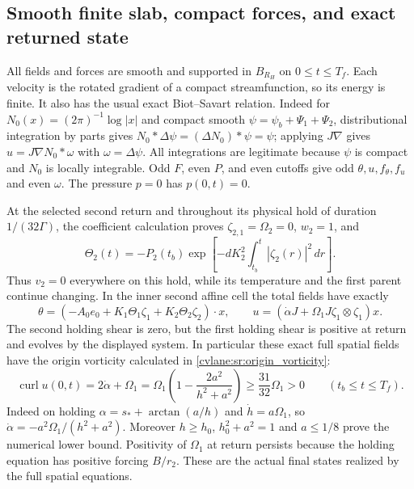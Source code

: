 \subsection{Smooth finite slab, compact forces, and exact returned state}

All fields and forces are smooth and supported in $B_{R_H}$ on
$0\leq t\leq T_f$. Each velocity is the rotated gradient of a
compact streamfunction, so its energy is finite. It also has the
usual exact Biot--Savart relation. Indeed for
$N_0(x)=(2\pi)^{-1}\log|x|$ and compact smooth
$\psi=\psi_b+\Psi_1+\Psi_2$, distributional integration by
parts gives $N_0*\Delta\psi=(\Delta N_0)*\psi=\psi$;
applying $J\nabla$ gives $u=J\nabla N_0*\omega$ with
$\omega=\Delta\psi$. All integrations are legitimate because
$\psi$ is compact and $N_0$ is locally integrable.
Odd $F$, even $P$, and even cutoffs give odd $\theta,u,f_\theta,f_u$
and even $\omega$. The pressure $p=0$ has $p(0,t)=0$.

At the selected second return and throughout its physical hold
of duration $1/(32\Gamma)$, the coefficient calculation proves
$\zeta_{2,1}=\Omega_2=0$, $w_2=1$, and
\[
 \Theta_2(t)=-P_2(t_b)
     \exp\left[-dK_2^2\int_{t_b}^t|\zeta_2(r)|^2\,dr\right].
\]
Thus $v_2=0$ everywhere on this hold, while its temperature and
the first parent continue changing. In the inner second affine
cell the total fields have exactly
\[
 \theta=\left(-A_0e_0+K_1\Theta_1\zeta_1
                          +K_2\Theta_2\zeta_2\right)\cdot x,
 \qquad
 u=\left(\dot\alpha J+\Omega_1J\zeta_1\otimes\zeta_1\right)x.
\]
The second holding shear is zero, but the first holding shear is
positive at return and evolves by the displayed system. In particular
these exact full spatial fields have the origin vorticity calculated
in \eqref{cvlane:sr:origin_vorticity}:
\begin{equation}\label{cvlane:ms:originvorticity}
 \operatorname{curl}u(0,t)=2\dot\alpha+\Omega_1
 =\Omega_1\left(1-\frac{2a^2}{h^2+a^2}\right)
 \geq\frac{31}{32}\Omega_1>0\qquad(t_b\leq t\leq T_f).
\end{equation}
Indeed on holding $\alpha=s_*+\arctan(a/h)$ and
$\dot h=a\Omega_1$, so $\dot\alpha=-a^2\Omega_1/(h^2+a^2)$.
Moreover $h\geq h_0$, $h_0^2+a^2=1$ and $a\leq1/8$ prove
the numerical lower bound. Positivity of $\Omega_1$ at return
persists because the holding equation has positive forcing $B/r_2$.
These are the actual final states realized by the full spatial equations.

